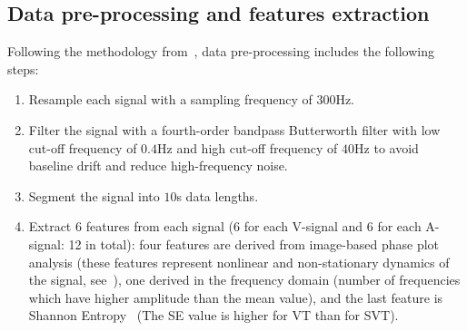 \subsection{Data pre-processing and features extraction}
Following the methodology 
from~\cite{hajeb2018automated}, data pre-processing includes the 
following steps:
\begin{enumerate}
	\item Resample each signal with a sampling frequency of $300$Hz.
	\item Filter the signal with a fourth-order bandpass Butterworth 
	filter with low cut-off frequency of $0.4$Hz and high cut-off 
	frequency of $40$Hz to avoid baseline drift and reduce 
	high-frequency noise. 
	\item Segment the signal into $10$s data lengths.
	\item Extract 6 features from each signal (6 for each V-signal 
	and 6 for each A-signal: 12 in total): 
	four features are derived 
	from image-based phase plot analysis 
	(these features represent nonlinear and non-stationary dynamics
	of the signal, see~\cite{hajeb2018automated}), one derived in the 
	frequency domain (number of frequencies which have higher 
	amplitude than the mean value), and the last feature is Shannon 
	Entropy~\cite{shannon1948mathematical} (The SE value is higher 
	for VT than for SVT).
\end{enumerate}

